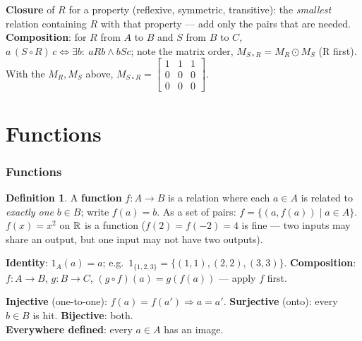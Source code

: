 \documentclass{fkt-notes}
\newcommand{\src}[1]{\par\noindent{\small\itshape Source: #1}\par\smallskip}
\newcommand{\kolman}[1]{\setcounter{section}{\numexpr#1-1\relax}}
\theoremstyle{definition}
\newtheorem*{defn}{Definition}
\begin{document}
\begin{rulepar}
  \textbf{Closure} of $R$ for a property (reflexive, symmetric, transitive):
  the \emph{smallest} relation containing $R$ with that property --- add
  only the pairs that are needed. \textbf{Composition}: for $R$ from $A$ to
  $B$ and $S$ from $B$ to $C$, $a\,(S\circ R)\,c\iff\exists b:\ aRb\wedge
    bSc$; note the matrix order, $M_{S\circ R}=M_R\odot M_S$ (R first). With
  the $M_R,M_S$ above, $M_{S\circ R}=\begin{bmatrix}1&1&1\\0&0&0\\0&0&0\end{bmatrix}$.
\end{rulepar}

\newpage
\part{Functions}

\kolman{1}
\section{Functions}\src{Kolman 5.1}\label{qg:func}
%

\begin{defn}
  A \textbf{function} $f:A\to B$ is a relation where each $a\in A$ is
  related to \emph{exactly one} $b\in B$; write $f(a)=b$. As a set of
  pairs: $f=\{(a,f(a))\mid a\in A\}$. $f(x)=x^2$ on $\mathbb{R}$ is a function
  ($f(2)=f(-2)=4$ is fine --- two inputs may share an output, but one input
  may not have two outputs).
\end{defn}

\textbf{Identity}: $1_A(a)=a$; e.g.\ $1_{\{1,2,3\}}=\{(1,1),(2,2),(3,3)\}$.
\textbf{Composition}: $f:A\to B$, $g:B\to C$, $(g\circ f)(a)=g(f(a))$ ---
apply $f$ first.

\begin{keybox}[title={Special types, for $f:A\to B$}]
  \textbf{Injective} (one-to-one): $f(a)=f(a')\Rightarrow a=a'$.\quad
  \textbf{Surjective} (onto): every $b\in B$ is hit.\quad
  \textbf{Bijective}: both.\\
  \textbf{Everywhere defined}: every $a\in A$ has an image.
\end{keybox}
\end{document}

